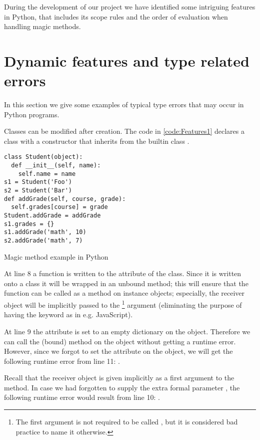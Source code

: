 During the development of our project we have identified some intriguing features in Python, that includes its scope rules and the order of evaluation when handling magic methods.

\section{Dynamic features and type related errors}
\label{Features}
In this section we give some examples of typical type errors that may occur in Python programs.

Classes can be modified after creation. The code in \autoref{code:Features1} declares a class  with a constructor that inherits from the builtin class .

\begin{listing}[H]
  \begin{verbatim}
class Student(object):
  def __init__(self, name):
    self.name = name
s1 = Student('Foo')
s2 = Student('Bar')
def addGrade(self, course, grade):
  self.grades[course] = grade
Student.addGrade = addGrade
s1.grades = {}
s1.addGrade('math', 10)
s2.addGrade('math', 7)
  \end{verbatim}
  \caption{Magic method example in Python}
  \label{code:Features1}
\end{listing}

At line 8 a function  is written to the  attribute of the  class. Since it is written onto a class it will be wrapped in an unbound method; this will ensure that the function can be called as a method on instance objects; especially, the receiver object will be implicitly passed to the \footnote{The first argument is not required to be called , but it is considered bad practice to name it otherwise.} argument (eliminating the purpose of having the  keyword as in e.g. JavaScript).

At line 9 the attribute  is set to an empty dictionary on the  object. Therefore we can call the (bound) method  on the  object without getting a runtime error. However, since we forgot to set the  attribute on the  object, we will get the following runtime error from line 11: . 

Recall that the receiver object is given implicitly as a first argument to the  method. 
In case we had forgotten to supply the extra formal parameter , the following runtime error would result from line 10:
. 


